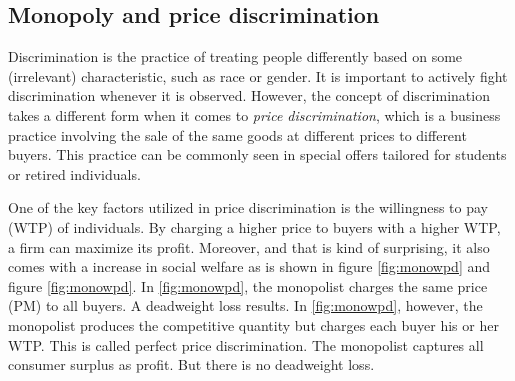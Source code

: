


\subsection{Monopoly and price discrimination}\label{monopoly-and-price-discrimination}

Discrimination is the practice of treating people differently based on some (irrelevant) characteristic, such as race or gender. It is important to actively fight discrimination whenever it is observed. However, the concept of discrimination takes a different form when it comes to \emph{price discrimination}, which is a business practice involving the sale of the same goods at different prices to different buyers. This practice can be commonly seen in special offers tailored for students or retired individuals.

One of the key factors utilized in price discrimination is the willingness to pay (WTP) of individuals. By charging a higher price to buyers with a higher WTP, a firm can maximize its profit. Moreover, and that is kind of surprising, it also comes with a increase in social welfare as is shown in figure \ref{fig:monowpd} and figure \ref{fig:monowpd}. In \ref{fig:monowpd}, the monopolist charges the same price (PM) to all buyers. A deadweight loss results. In \ref{fig:monowpd}, however, the monopolist produces the competitive quantity but charges each buyer his or her WTP. This is called perfect price discrimination. The monopolist captures all consumer surplus as profit. But there is no deadweight loss.

